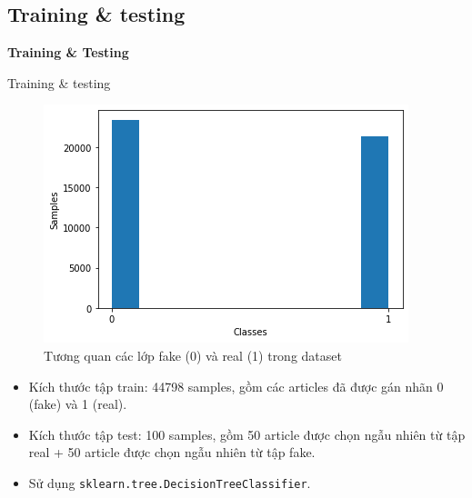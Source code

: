 \documentclass[aspectratio=169,xcolor=dvipsnames]{beamer}
\begin{document}
\subsection{Training \& testing}

\begin{frame}
	\Huge{\centerline{\textbf{Training \& Testing}}}
\end{frame}

\begin{frame}{Training \& testing}
\begin{figure}
\includegraphics[width=0.35\linewidth]{img/data-summerise.png}
\caption{Tương quan các lớp fake (0) và real (1) trong dataset}
\end{figure}

\begin{itemize}
\item Kích thước tập train: 44798 samples, gồm các articles đã được gán nhãn 0 (fake) và 1 (real).
\item Kích thước tập test: 100 samples, gồm 50 article được chọn ngẫu nhiên từ tập real + 50 article được chọn ngẫu nhiên từ tập fake.
\item Sử dụng \texttt{sklearn.tree.DecisionTreeClassifier}.
\end{itemize}
\end{frame}
\end{document}
